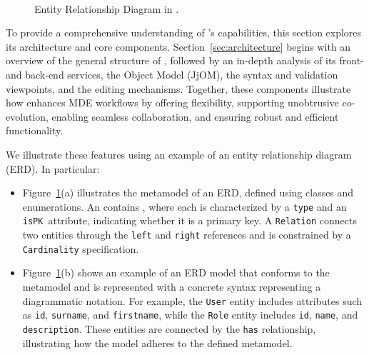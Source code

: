 


\begin{figure}[t]
    \centering
    \\[5mm]
    \caption{Entity Relationship Diagram in \jjodel{}.}
    \label{fig:erd}
\end{figure}



To provide a comprehensive understanding of \jjodel{}’s capabilities, this section explores its architecture and core components. Section~\ref{sec:architecture} begins with an overview of the general structure of \jjodel{}, followed by an in-depth analysis of its front- and back-end services, the \jjodel{} Object Model (JjOM), the syntax and validation viewpoints, and the editing mechanisms. Together, these components illustrate how \jjodel{} enhances MDE workflows by offering flexibility, supporting unobtrusive co-evolution, enabling seamless collaboration, and ensuring robust and efficient functionality.

We illustrate these features using an example of an entity relationship diagram (ERD). In particular:


\begin{itemize}
    \item Figure~\ref{fig:erd}(a) illustrates the metamodel of an ERD, defined using classes and enumerations. An  contains , where each  is characterized by a \texttt{type} and an \texttt{isPK}~attribute, indicating whether it is a primary key. A \texttt{Relation} connects two entities through the \texttt{left} and \texttt{right} references and is constrained by a \texttt{Cardinality} specification.
    
    \item Figure~\ref{fig:erd}(b) shows an example of an ERD model that conforms to the metamodel and is represented with a concrete syntax representing a diagrammatic notation. For example, the \texttt{User} entity includes attributes such as \texttt{id}, \texttt{surname}, and \texttt{firstname}, while the \texttt{Role} entity includes \texttt{id}, \texttt{name}, and \texttt{description}. These entities are connected by the \texttt{has} relationship, illustrating how the model adheres to the defined metamodel.
\end{itemize}

